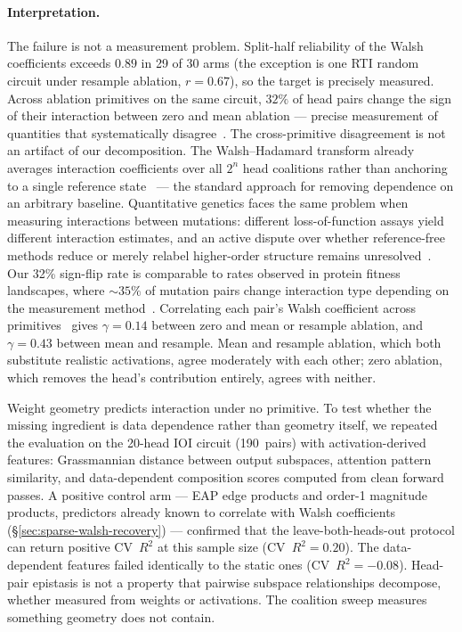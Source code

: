 \documentclass{article}
\begin{document}
\paragraph{Interpretation.}

The failure is not a measurement problem. Split-half reliability of the Walsh
coefficients exceeds $0.89$ in 29 of 30 arms (the exception is one RTI random
circuit under resample ablation, $r = 0.67$), so the target is precisely
measured. Across ablation primitives on the same circuit, $32\%$ of head pairs
change the sign of their interaction between zero and mean ablation --- precise
measurement of quantities that systematically
disagree~\citep{housden2017comparison}.
The cross-primitive disagreement is not an artifact of our decomposition.
The Walsh--Hadamard transform already averages interaction coefficients over
all $2^n$ head coalitions rather than anchoring to a single reference
state~\citep{poelwijk2016context,poelwijk2019learning} --- the standard
approach for removing dependence on an arbitrary baseline. Quantitative
genetics faces the same problem when measuring interactions between mutations:
different loss-of-function assays yield different interaction estimates, and an
active dispute over whether reference-free methods reduce or merely relabel
higher-order structure remains
unresolved~\citep{park2024simplicity,dupic2024protein,buda2024higher}. Our
32\% sign-flip rate is comparable to rates observed in protein fitness
landscapes, where ${\sim}35\%$ of mutation pairs change interaction type
depending on the measurement
method~\citep{fluidity2024elife,housden2017comparison}. Correlating each
pair's Walsh coefficient across primitives~\citep{ferretti2016measuring} gives
$\gamma = 0.14$ between zero and mean or resample ablation, and $\gamma = 0.43$
between mean and resample. Mean and resample ablation, which both substitute
realistic activations, agree moderately with each other; zero ablation, which
removes the head's contribution entirely, agrees with neither.

Weight geometry predicts interaction under no primitive.
To test whether the missing ingredient is data dependence rather than geometry
itself, we repeated the evaluation on the 20-head IOI circuit (190~pairs) with
activation-derived features: Grassmannian distance between output subspaces,
attention pattern similarity, and data-dependent composition scores computed
from clean forward passes. A positive control arm --- EAP edge products and
order-1 magnitude products, predictors already known to correlate with Walsh
coefficients (\S\ref{sec:sparse-walsh-recovery}) --- confirmed that the
leave-both-heads-out protocol can return positive CV~$R^2$ at this sample size
(CV~$R^2 = 0.20$). The data-dependent features failed identically to the
static ones (CV~$R^2 = {-}0.08$). Head-pair epistasis is not a property that
pairwise subspace relationships decompose, whether measured from weights or
activations. The coalition sweep measures something geometry does not contain.
\end{document}
